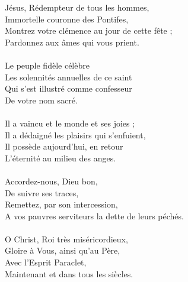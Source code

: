 Jésus, Rédempteur de tous les hommes,\\
Immortelle couronne des Pontifes,\\
Montrez votre clémence au jour de cette fête ;\\
Pardonnez aux âmes qui vous prient.\\
\\
Le peuple fidèle célèbre\\
Les solennités annuelles de ce saint\\
Qui s'est illustré comme confesseur\\
De votre nom sacré.\\
\\
Il a vaincu et le monde et ses joies ;\\
Il a dédaigné les plaisirs qui s'enfuient,\\
Il possède aujourd'hui, en retour\\
L'éternité au milieu des anges.\\
\\
Accordez-nous, Dieu bon,\\
De suivre ses traces,\\
Remettez, par son intercession,\\
A vos pauvres serviteurs la dette de leurs péchés.\\
\\
O Christ, Roi très miséricordieux,\\
Gloire à Vous, ainsi qu'au Père,\\
Avec l'Esprit Paraclet,\\
Maintenant et dans tous les siècles.